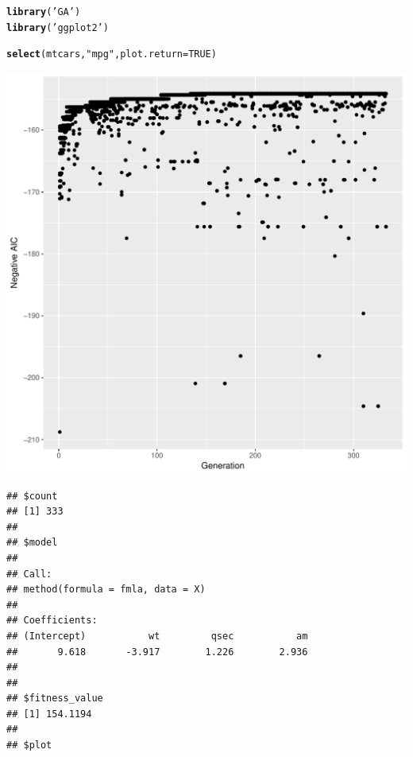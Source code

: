 \documentclass{article}\usepackage[]{graphicx}\usepackage[]{color}
\makeatletter
\def\maxwidth{ %
  \ifdim\Gin@nat@width>\linewidth
    \linewidth
  \else
    \Gin@nat@width
  \fi
}
\newcommand{\hlnum}[1]{\textcolor[rgb]{0.686,0.059,0.569}{#1}}%
\newcommand{\hlstr}[1]{\textcolor[rgb]{0.192,0.494,0.8}{#1}}%
\newcommand{\hlstd}[1]{\textcolor[rgb]{0.345,0.345,0.345}{#1}}%
\newcommand{\hlkwc}[1]{\textcolor[rgb]{0.333,0.667,0.333}{#1}}%
\newcommand{\hlkwd}[1]{\textcolor[rgb]{0.737,0.353,0.396}{\textbf{#1}}}%
\newenvironment{kframe}{%
 \def\at@end@of@kframe{}%
 \ifinner\ifhmode%
  \def\at@end@of@kframe{\end{minipage}}%
  \begin{minipage}{\columnwidth}%
 \fi\fi%
 \def\FrameCommand##1{\hskip\@totalleftmargin \hskip-\fboxsep
 \colorbox{shadecolor}{##1}\hskip-\fboxsep
     \hskip-\linewidth \hskip-\@totalleftmargin \hskip\columnwidth}%
 \MakeFramed {\advance\hsize-\width
   \@totalleftmargin\z@ \linewidth\hsize
   \@setminipage}}%
 {\par\unskip\endMakeFramed%
 \at@end@of@kframe}
\newenvironment{knitrout}{}{} %
\makeatother
\begin{document}
\begin{knitrout}
\color{fgcolor}\begin{kframe}
\begin{alltt}
\hlkwd{library}\hlstd{(}\hlstr{'GA'}\hlstd{)}
\hlkwd{library}\hlstd{(}\hlstr{'ggplot2'}\hlstd{)}

\hlkwd{select}\hlstd{(mtcars,} \hlstr{"mpg"}\hlstd{,} \hlkwc{plot.return} \hlstd{=} \hlnum{TRUE}\hlstd{)}
\end{alltt}
\end{kframe}
\includegraphics[width=\maxwidth]{figure/unnamed-chunk-1-1} 
\begin{kframe}\begin{verbatim}
## $count
## [1] 333
## 
## $model
## 
## Call:
## method(formula = fmla, data = X)
## 
## Coefficients:
## (Intercept)           wt         qsec           am  
##       9.618       -3.917        1.226        2.936  
## 
## 
## $fitness_value
## [1] 154.1194
## 
## $plot
\end{verbatim}
\end{kframe}

\end{knitrout}
\end{document}
